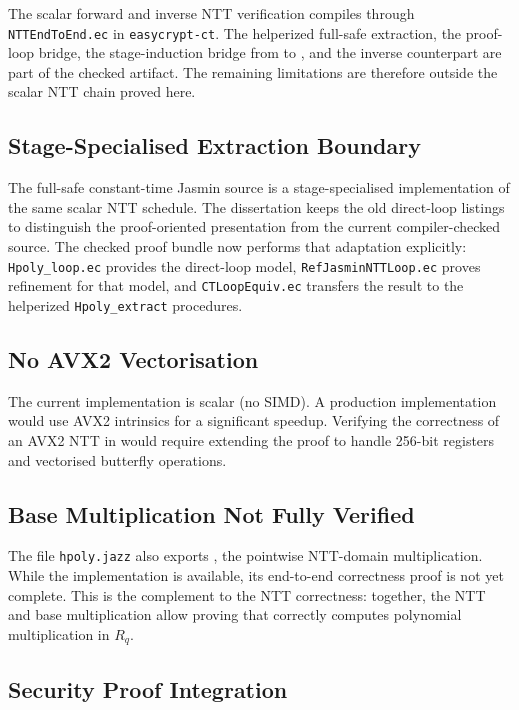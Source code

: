 The scalar forward and inverse NTT verification compiles through
\texttt{NTTEndToEnd.ec} in \texttt{easycrypt-ct}.  The helperized
full-safe extraction, the proof-loop bridge, the stage-induction bridge from
 to , and the inverse
counterpart are part of the checked artifact.  The remaining limitations are
therefore outside the scalar NTT chain proved here.

\subsection{Stage-Specialised Extraction Boundary}

The full-safe constant-time Jasmin source is a stage-specialised
implementation of the same scalar NTT schedule.  The dissertation keeps the
old direct-loop listings to distinguish the proof-oriented presentation from
the current compiler-checked source.  The checked proof bundle now performs
that adaptation explicitly: \texttt{Hpoly\_loop.ec} provides the direct-loop
model, \texttt{RefJasminNTT\allowbreak Loop.ec} proves refinement for that model, and
\texttt{CTLoopEquiv.ec} transfers the result to the helperized
\texttt{Hpoly\_extract} procedures.

\subsection{No AVX2 Vectorisation}

The current \jasmin{} implementation is scalar (no SIMD).  A production
\haetae{} implementation would use AVX2 intrinsics for a significant
speedup.  Verifying the correctness of an AVX2 NTT in \easycrypt{} would
require extending the proof to handle 256-bit registers and vectorised butterfly
operations.

\subsection{Base Multiplication Not Fully Verified}

The file \texttt{hpoly.jazz} also exports , the
pointwise NTT-domain multiplication.  While the \jasmin{} implementation is
available, its end-to-end correctness proof is not yet complete.  This is
the complement to the NTT correctness: together, the NTT and base
multiplication allow proving that  correctly
computes polynomial multiplication in $R_q$.

\subsection{Security Proof Integration}

